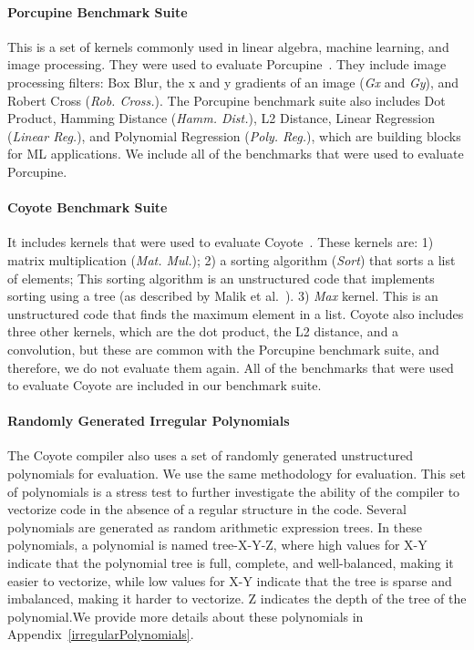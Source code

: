 \paragraph{Porcupine Benchmark Suite} This is a set of kernels commonly used in linear algebra, machine learning, and image processing. They were used to evaluate Porcupine~\cite{Cowan2021Porcupine}. They include image processing filters: Box Blur, the x and y gradients of an image (\emph{Gx} and \emph{Gy}), and Robert Cross (\emph{Rob. Cross.}). The Porcupine benchmark suite also includes Dot Product, Hamming Distance (\emph{Hamm. Dist.}), L2 Distance, Linear Regression (\emph{Linear Reg.}), and Polynomial Regression (\emph{Poly. Reg.}), which are building blocks for ML applications. We include all of the benchmarks that were used to evaluate Porcupine.

\paragraph{Coyote Benchmark Suite} It includes kernels that were used to evaluate Coyote~\cite{Malik2023Coyote}. These kernels are: 1) matrix multiplication (\emph{Mat. Mul.}); 2) a sorting algorithm (\emph{Sort}) that sorts a list of elements; This sorting algorithm is an unstructured code that implements sorting using a tree (as described by Malik et al.~\cite{Malik2023Coyote}).
3) \emph{Max} kernel. This is an unstructured code that finds the maximum element in a list.
Coyote also includes three other kernels, which are the dot product, the L2 distance, and a convolution, but these are common with the Porcupine benchmark suite, and therefore, we do not evaluate them again.
All of the benchmarks that were used to evaluate Coyote are included in our benchmark suite.

\shrink[0.25]
\paragraph{Randomly Generated Irregular Polynomials} The Coyote compiler also uses a set of randomly generated unstructured polynomials for evaluation. We use the same methodology for evaluation. This set of polynomials is a stress test to further investigate the ability of the compiler to vectorize code in the absence of a regular structure in the code. Several polynomials are generated as random arithmetic expression trees. In these polynomials, a polynomial is named tree-X-Y-Z, where high values for X-Y indicate that the polynomial tree is full, complete, and well-balanced, making it easier to vectorize, while low values for X-Y indicate that the tree is sparse and imbalanced, making it harder to vectorize. Z indicates the depth of the tree of the polynomial.\ifshowextra We provide more details about these polynomials in Appendix~\ref{irregularPolynomials}.\fi



